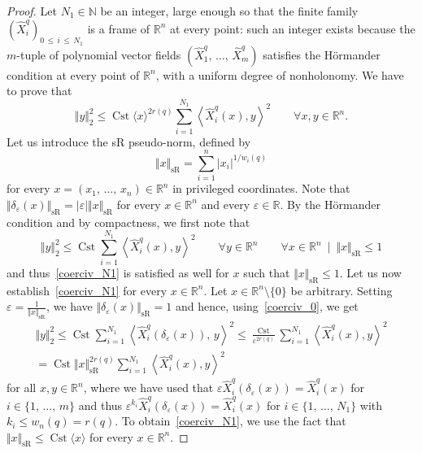 \documentclass[10pt]{amsart}
\theoremstyle{definition}\newtheorem{defi}[theo]{Definition}\newtheorem{rema}[theo]{Remark}\newtheorem{exam}[theo]{Example}\newtheorem{exem}[theo]{Example}\newtheorem{nota}[theo]{Notation}
\newcommand*\R{\mathbb{R}}
\newcommand*\N{\mathbb{N}}
\DeclareMathOperator{\Cst}{Cst}
\DeclareMathOperator{\sR}{sR}
\renewcommand{\leq}{\leqslant}
\let\oldforall\forall
\renewcommand*{\forall}{\mathrel{\oldforall}}
\begin{document}
\begin{proof}
Let $N_1\in\N$ be an integer, large enough so that the finite family $(\widehat{X}_i^{q})_{0\,\leq\,i\,\leq\,N_1}$ is a frame of $\R^n$ at every point: such an integer exists because the $m$-tuple of polynomial vector fields $(\widehat{X}_1^{q},\,\ldots,\,\widehat{X}_m^{q})$ satisfies the H\"ormander condition at every point of $\R^n$, with a uniform degree of nonholonomy. We have to prove that
\begin{equation}\label{coerciv_N1}
\Vert y\Vert_2^2\leq\Cst\langle x\rangle^{2r(q)}\sum_{i=1}^{N_1} \left\langle \widehat{X}^{q}_i(x),y\right\rangle^2
\qquad \forall x,y\in\R^n.
\end{equation}
Let us introduce the sR pseudo-norm, defined by
\[
\Vert x\Vert_{\sR} = \sum_{i=1}^n \vert x_i\vert^{1/w_i(q)}
\]
for every $x=(x_1,\,\ldots,\,x_n)\in\R^n$ in privileged coordinates. Note that $\Vert\delta_\varepsilon(x)\Vert_{\sR}=\vert\varepsilon\vert\Vert x\Vert_{\sR}$ for every $x\in\R^n$ and every $\varepsilon\in\R$. By the H\"ormander condition and by compactness, we first note that
\begin{equation}\label{coerciv_0}
\Vert y\Vert_2^2\leq\Cst\sum_{i=1}^{N_1} \left\langle \widehat{X}^{q}_i(x),y\right\rangle^2
\qquad \forall y\in\R^n\qquad\forall x\in\R^n\ \mid\ \Vert x\Vert_{\sR}\leq 1
\end{equation}
and thus~\eqref{coerciv_N1} is satisfied as well for $x$ such that $\Vert x\Vert_{\sR}\leq 1$. Let us now establish~\eqref{coerciv_N1} for every $x\in\R^n$. Let $x\in\R^n\setminus\{0\}$ be arbitrary. Setting $\varepsilon=\frac{1}{\Vert x\Vert_{\sR}}$, we have $\Vert\delta_\varepsilon(x)\Vert_{\sR}=1$ and hence, using~\eqref{coerciv_0}, we get
\begin{multline*}
\Vert y\Vert_2^2\leq\Cst\sum_{i=1}^{N_1} \left\langle \widehat{X}^{q}_i(\delta_\varepsilon(x)),\,y\right\rangle^2
\leq \frac{\Cst}{\varepsilon^{2r(q)}} \sum_{i=1}^{N_1} \left\langle \widehat{X}^{q}_i(x),y\right\rangle^2 \\
= \Cst\Vert x\Vert_{\sR}^{2r(q)} \sum_{i=1}^{N_1} \left\langle \widehat{X}^{q}_i(x),y\right\rangle^2
\end{multline*}
for all $x,y\in\R^n$, where we have used that $\varepsilon\widehat{X}^{q}_i(\delta_\varepsilon(x))=\widehat{X}^{q}_i(x)$ for $i\in\{1,\,\ldots,\,m\}$ and thus $\varepsilon^{k_i}\widehat{X}^{q}_i(\delta_\varepsilon(x))=\widehat{X}^{q}_i(x)$ for $i\in\{1,\,\ldots,\,N_1\}$ with $k_i\leq w_n(q)=r(q)$. To obtain~\eqref{coerciv_N1}, we use the fact that $\Vert x\Vert_{\sR}\leq\Cst\langle x\rangle$ for every $x\in\R^n$.
\goodbreak


\end{proof}
\end{document}
